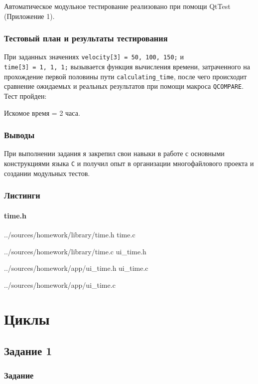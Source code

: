 \documentclass[12pt,a4paper]{report}
\begin{document}
Автоматическое модульное тестирование реализовано при помощи QtTest (Приложение 1).

\subsection{Тестовый план и результаты тестирования}
\hspace{\parindent}При заданных значениях \mbox{\texttt{velocity[3] = {50, 100, 150;}}} и \\\mbox{\texttt{time[3] = {1, 1, 1;}}} вызывается функция вычисления времени, затраченного на прохождение первой половины пути \texttt{calculating\_time}, после чего происходит сравнение ожидаемых и реальных результатов при помощи макроса \texttt{QCOMPARE}. Тест пройден: 
\begin{center}Искомое время = 2 часа.\end{center}

\subsection{Выводы}
\hspace{\parindent}При выполнении задания я закрепил свои навыки в работе с основными конструкциями языка \texttt{C} и получил опыт в организации многофайлового проекта и создании модульных тестов.

\newpage
\subsection*{Листинги}
\subsubsection*{time.h}

{../sources/homework/library/time.h}
time.c

{../sources/homework/library/time.c}
ui\_time.h

{../sources/homework/app/ui_time.h}
ui\_time.c

{../sources/homework/app/ui_time.c}
\newpage

\chapter{Циклы}
\section{Задание 1}
\subsection{Задание}
\end{document}
